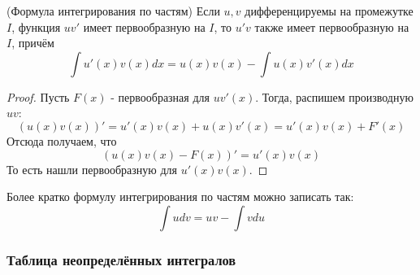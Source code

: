 \begin{theorem} (Формула интегрирования по частям)
	Если $u, v$ дифференцируемы на промежутке $I$, функция $uv'$ имеет первообразную на $I$, то $u'v$ также имеет первообразную на $I$, причём
	\[
		\int u'(x)v(x)dx = u(x)v(x) - \int u(x)v'(x)dx
	\]
\end{theorem}

\begin{proof}
	Пусть $F(x)$ - первообразная для $uv'(x)$. Тогда, распишем производную $uv$:
	\[
		\left(u(x)v(x)\right)' = u'(x)v(x) + u(x)v'(x) = u'(x)v(x) + F'(x)
	\]
	Отсюда получаем, что
	\[
		(u(x)v(x) - F(x))' = u'(x)v(x)
	\]
	То есть нашли первообразную для $u'(x)v(x)$.
\end{proof}

\begin{note}
	Более кратко формулу интегрирования по частям можно записать так:
	\[
		\int udv = uv - \int vdu
	\]
\end{note}

\subsubsection*{Таблица неопределённых интегралов}

